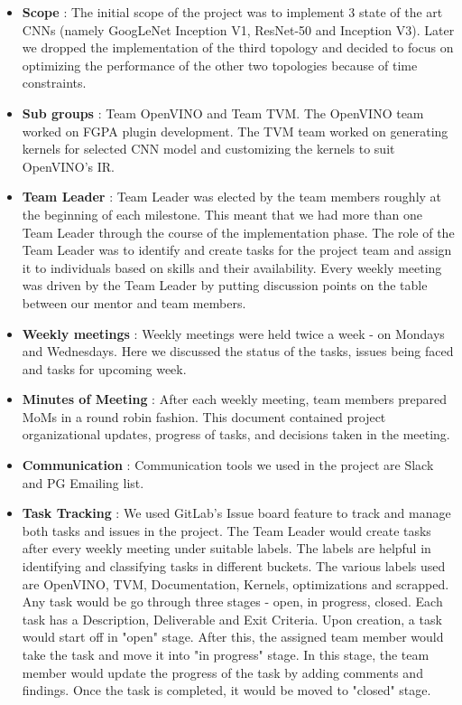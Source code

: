 \begin{itemize}
\item \textbf{Scope} : The initial scope of the project was to implement 3 state of the art CNNs (namely GoogLeNet Inception V1,  ResNet-50 and Inception V3). Later we dropped the implementation of the third topology and decided to focus on optimizing the performance of the other two topologies because of time constraints.
\item \textbf{Sub groups} : Team OpenVINO and Team TVM. The OpenVINO team worked on FGPA plugin development. The TVM team worked on generating kernels for selected CNN model and customizing the kernels to suit OpenVINO's IR. 
\item \textbf{Team Leader} : Team Leader was elected by the team members roughly at the beginning of each milestone. This meant that we had more than one Team Leader through the course of the implementation phase. The role of the Team Leader was to identify and create tasks for the project team and assign it to individuals based on skills and their availability. Every weekly meeting was driven by the Team Leader by putting discussion points on the table between our mentor and team members. 
\item  \textbf{Weekly meetings} : Weekly meetings were held twice a week - on Mondays and Wednesdays. Here we discussed the status of the tasks, issues being faced and tasks for upcoming week.
\item \textbf{Minutes of Meeting} : After each weekly meeting, team members prepared MoMs in a round robin fashion. This document contained project organizational updates, progress of tasks, and decisions taken in the meeting.
\item \textbf{Communication} : Communication tools we used in the project are Slack and PG Emailing list.
\item \textbf{Task Tracking} : We used GitLab's Issue board feature to track and manage both tasks and issues in the project. The Team Leader would create tasks after every weekly meeting under suitable labels. The labels are helpful in identifying and classifying tasks in different buckets. The various labels used are OpenVINO, TVM, Documentation, Kernels, optimizations and scrapped. Any task would be go through three stages - open, in progress, closed. Each task has a Description, Deliverable and  Exit Criteria. Upon creation, a task would start off in "open" stage. After this, the assigned team member would take the task and move it into "in progress" stage. In this stage, the team member would update the progress of the task by adding comments and findings. Once the task is completed, it would be moved to "closed" stage. 
\end{itemize}

